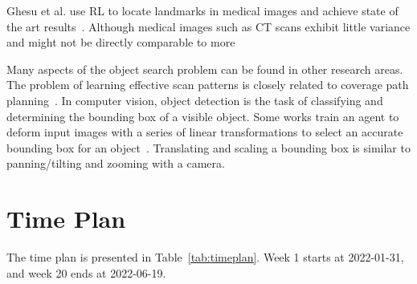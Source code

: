 \documentclass{article}
\begin{document}
Ghesu et al. use RL to locate landmarks in medical images and achieve state of the art results~\cite{ghesu2016,ghesu2019}. Although medical images such as CT scans exhibit little variance and might not be directly comparable to more 

Many aspects of the object search problem can be found in other research areas. The problem of learning effective scan patterns is closely related to coverage path planning~\cite{galceran2013}. In computer vision, object detection is the task of classifying and determining the bounding box of a visible object. Some works train an agent to deform input images with a series of linear transformations to select an accurate bounding box for an object~\cite{caicedo2015,jie2017}. Translating and scaling a bounding box is similar to panning/tilting and zooming with a camera. 

\section{Time Plan}

The time plan is presented in Table~\ref{tab:timeplan}. Week 1 starts at 2022-01-31, and week 20 ends at 2022-06-19.
\end{document}
